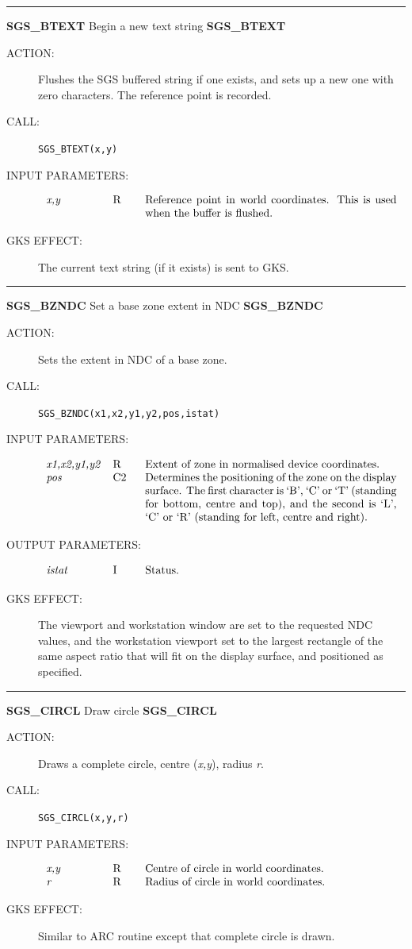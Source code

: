 \documentclass[11pt]{article}
\newcommand{\xlabel}[1]{}
\newcommand{\rthead}[2]{\rule{\textwidth}{0.3mm}
{\Large {\bf #1} \hfill #2 \hfill {\bf #1}}}
\newenvironment{params}%
{\[\begin{tabular}{p{0.14\textwidth}p{0.05\textwidth}p{0.66\textwidth}}}%
{\end{tabular}\]}
\newcommand{\rparams}[3]{{\em #1} &#2 &#3\\}
\newcommand{\rthead}[2]{\subsection{\label{#1}\xlabel{#1}#1 - #2}}
\newenvironment{params}{\begin{description}}{\end{description}}
\newcommand{\rparams}[3]{\item{{\em #1}} (#2) #3}
\begin{document}
\rthead{SGS\_BTEXT}{Begin a new text string}
\begin{description}
\item [ACTION:]
Flushes the SGS buffered string if one exists, and sets up a new one with zero
characters.
The reference point is recorded.
\item [CALL:]
{\tt SGS\_BTEXT(x,y)}
\item [INPUT PARAMETERS:]
\begin{params}
\rparams{x,y}{R}{Reference point in world coordinates.
This is used when the buffer is flushed.}
\end{params}
\item [GKS EFFECT:]
The current text string (if it exists) is sent to GKS.
\end{description}
\goodbreak

\rthead{SGS\_BZNDC}{Set a base zone extent in NDC}
\begin{description}
\item [ACTION:]
Sets the extent in NDC of a base zone.
\item [CALL:]
{\tt SGS\_BZNDC(x1,x2,y1,y2,pos,istat)}
\item [INPUT PARAMETERS:]
\begin{params}
\rparams{x1,x2,y1,y2}{R}{Extent of zone in normalised device coordinates.}
\rparams{pos}{C2}{Determines the positioning of the zone on the display surface.
The first character is `B', `C' or `T' (standing for bottom, centre and top), and
the second is `L', `C' or `R' (standing for left, centre and right).}
\end{params}
\item [OUTPUT PARAMETERS:]
\begin{params}
\rparams{istat}{I}{Status.}
\end{params}
\item [GKS EFFECT:]
The viewport and workstation window are set to the requested NDC values, and the
workstation viewport set to the largest rectangle of the same aspect ratio that
will fit on the display surface, and positioned as specified.
\end{description}
\goodbreak

\rthead{SGS\_CIRCL}{Draw circle}
\begin{description}
\item [ACTION:]
Draws a complete circle, centre ({\em x,y}), radius {\em r}.
\item [CALL:]
{\tt SGS\_CIRCL(x,y,r)}
\item [INPUT PARAMETERS:]
\begin{params}
\rparams{x,y}{R}{Centre of circle in world coordinates.}
\rparams{r}{R}{Radius of circle in world coordinates.}
\end{params}
\item [GKS EFFECT:]
Similar to ARC routine except that complete circle is drawn.
\end{description}
\goodbreak
\end{document}

